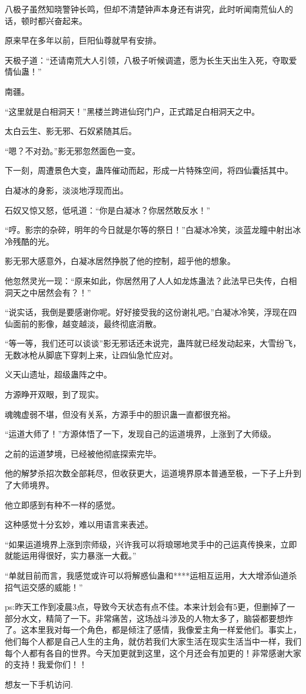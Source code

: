 \begin{this_body}
八极子虽然知晓警钟长鸣，但却不清楚钟声本身还有讲究，此时听闻南荒仙人的话，顿时都兴奋起来。

原来早在多年以前，巨阳仙尊就早有安排。

天极子道：“还请南荒大人引领，八极子听候调遣，愿为长生天出生入死，夺取爱情仙蛊！”

南疆。

“这里就是白相洞天！”黑楼兰跨进仙窍门户，正式踏足白相洞天之中。

太白云生、影无邪、石奴紧随其后。

“嗯？不对劲。”影无邪忽然面色一变。

下一刻，周遭景色大变，蛊阵催动而起，形成一片特殊空间，将四仙囊括其中。

白凝冰的身影，淡淡地浮现而出。

石奴又惊又怒，低吼道：“你是白凝冰？你居然敢反水！”

“哼。影宗的杂碎，明年的今日就是尔等的祭日！”白凝冰冷笑，淡蓝龙瞳中射出冰冷残酷的光。

影无邪大感意外，白凝冰居然挣脱了他的控制，超乎他的想象。

他忽然灵光一现：“原来如此，你居然用了人人如龙炼蛊法？此法早已失传，白相洞天之中居然会有？！”

“说实话，我倒是要感谢你呢。好好接受我的这份谢礼吧。”白凝冰冷笑，浮现在四仙面前的影像，越变越淡，最终彻底消散。

“等一等，我们还可以谈谈”影无邪话还未说完，蛊阵就已经发动起来，大雪纷飞，无数冰枪从脚底下穿刺上来，让四仙急忙应对。

义天山遗址，超级蛊阵之中。

方源睁开双眼，到了现实。

魂魄虚弱不堪，但没有关系，方源手中的胆识蛊一直都很充裕。

“运道大师了！”方源体悟了一下，发现自己的运道境界，上涨到了大师级。

之前的运道梦境，已经被他彻底探索完毕。

他的解梦杀招次数全部耗尽，但收获更大，运道境界原本普通至极，一下子上升到了大师境界。

他立即感到有种不一样的感觉。

这种感觉十分玄妙，难以用语言来表述。

“如果运道境界上涨到宗师级，兴许我可以将琅琊地灵手中的己运真传换来，立即就能运用得很好，实力暴涨一大截。”

“单就目前而言，我感觉或许可以将解惑仙蛊和****运相互运用，大大增添仙道杀招气运交感的威能！”

ps:昨天工作到凌晨3点，导致今天状态有点不佳。本来计划会有5更，但删掉了一部分水文，精简了一下。非常痛苦，这场战斗涉及的人物太多了，脑袋都要想炸了。这本里我对每一个角色，都是倾注了感情，我像爱主角一样爱他们。事实上，他们每个人都是自己人生的主角，就仿若我们大家生活在现实生活当中一样，我们每个人都有各自的世界。今天加更就到这里，这个月还会有加更的！非常感谢大家的支持！我爱你们！！

想友一下手机访问.

\end{this_body}

